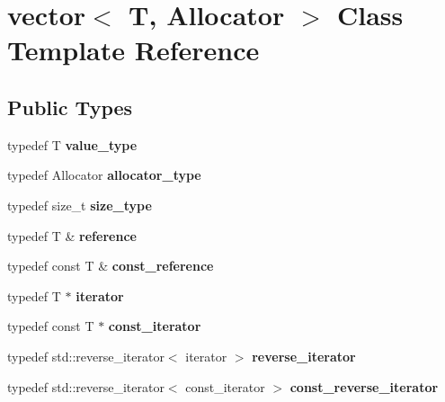 \hypertarget{classvector}{}\section{vector$<$ T, Allocator $>$ Class Template Reference}
\label{classvector}
\subsection*{Public Types}
\begin{DoxyCompactItemize}
\item 
\mbox{\label{classvector_a704a0ed92ba601b4ea956ce508989b26}} 
typedef T {\bfseries value\+\_\+type}
\item 
\mbox{\label{classvector_a522900e7c01e369364dd6acca4843a9a}} 
typedef Allocator {\bfseries allocator\+\_\+type}
\item 
\mbox{\label{classvector_a42702e788b167f782f1147fe61046244}} 
typedef size\+\_\+t {\bfseries size\+\_\+type}
\item 
\mbox{\label{classvector_a517327726c58e81b1e7158b298c40dde}} 
typedef T \& {\bfseries reference}
\item 
\mbox{\label{classvector_ac8e7573d9635db2ab69d7eeb62887069}} 
typedef const T \& {\bfseries const\+\_\+reference}
\item 
\mbox{\label{classvector_a560ee0c6e3d62147071bc34b89524f4f}} 
typedef T $\ast$ {\bfseries iterator}
\item 
\mbox{\label{classvector_a0cc9d1779ccadbfd727273edb41e59fc}} 
typedef const T $\ast$ {\bfseries const\+\_\+iterator}
\item 
\mbox{\label{classvector_a6766552a9f111971c16625a1299ddb3e}} 
typedef std\+::reverse\+\_\+iterator$<$ iterator $>$ {\bfseries reverse\+\_\+iterator}
\item 
\mbox{\label{classvector_af6ad3fd9db974375c8f9c2a6021e7a4a}} 
typedef std\+::reverse\+\_\+iterator$<$ const\+\_\+iterator $>$ {\bfseries const\+\_\+reverse\+\_\+iterator}
\end{DoxyCompactItemize}
